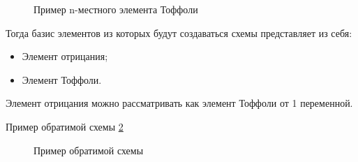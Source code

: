 \documentclass[14pt]{extarticle} %
\begin{document}
\begin{figure}[h]
	\caption{Пример n-местного элемента Тоффоли }
	\centering
	
	\label{nish}
\end{figure}


Тогда базис элементов из которых будут создаваться схемы представляет из себя:

\begin{itemize}
	\item Элемент отрицания;
	\item Элемент Тоффоли.
\end{itemize}

Элемент отрицания можно рассматривать как элемент Тоффоли от 1 переменной.

Пример обратимой схемы \ref{circuit_example1}

\begin{figure}[h]
	\caption{Пример обратимой схемы}
	\centering
	
	\label{circuit_example1}
\end{figure}
 
\end{document}
